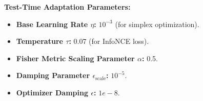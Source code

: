 \documentclass{article}
\theoremstyle{plain}
\theoremstyle{definition}
\theoremstyle{remark}
\begin{document}
\textbf{Test-Time Adaptation Parameters:}
\begin{itemize}
    \item \textbf{Base Learning Rate $\eta$:} $10^{-3}$ (for simplex optimization).
    \item \textbf{Temperature $\tau$:} 0.07 (for InfoNCE loss).
    \item \textbf{Fisher Metric Scaling Parameter $\alpha$:} 0.5.
    \item \textbf{Damping Parameter $\epsilon_{\text{scale}}$:} $10^{-5}$.
    \item \textbf{Optimizer Damping $\epsilon$:} $1e-8$.
\end{itemize}
\end{document}
